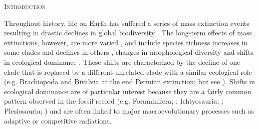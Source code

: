\documentclass[12pt,letterpaper]{article}
\renewcommand{\section}[1]{%
\bigskip
\begin{center}
\begin{Large}
\normalfont\scshape #1
\medskip
\end{Large}
\end{center}}
\begin{document}
\section{Introduction}
%
%
Throughout history, life on Earth has suffered a series of mass extinction events resulting in drastic declines in global biodiversity \citep[e.g.][]{RaupPT,BentonPT,rennetime2013,Brusatte2015}.
The long-term effects of mass extinctions, however, are more varied \citep{Erwin1998344}, and include species richness increases in some clades \citep{friedmanexplosive2010} and declines in others \citep{Benton85}, changes in morphological diversity \citep{Ciampaglio2001,Ciampaglio2004,kornextinction2013} and shifts in ecological dominance \citep[e.g.][]{Brusatte12092008,toljagictriassic-jurassic2013,bensonfaunal2014}.
These shifts are characterized by the decline of one clade that is replaced by a different unrelated clade with a similar ecological role (e.g. Brachiopoda and Bivalvia at the end Permian extinction; \citealt{Liow2015} %
 but see \citealt{Payne22052014}). 
Shifts in ecological dominance are of particular interest because they are a fairly common pattern observed in the fossil record (e.g. Foraminifera; \citealt{Coxall01042006} %
; Ichtyosauria; \citealt{thorneresetting2011}; Plesiosauria; \citealt{bensonfaunal2014}) and are often linked to major macroevolutionary processes such as adaptive \citep{Losos2010} or competitive \citep{Brusatte12092008} radiations.
\end{document}
